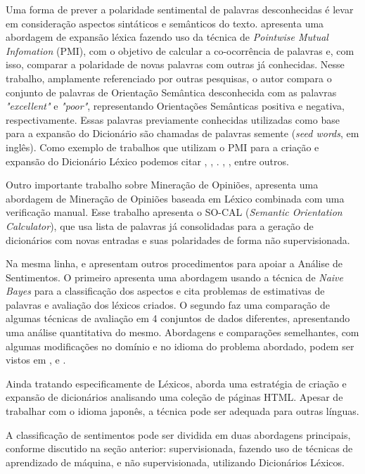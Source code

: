 \documentclass[12pt]{article}
\begin{document}
Uma forma de prever a polaridade sentimental de palavras desconhecidas é levar em consideração aspectos sintáticos e semânticos do texto. \cite{Turney2002} apresenta uma abordagem de expansão léxica fazendo uso da técnica de \emph{Pointwise Mutual Infomation} (PMI), com o objetivo de calcular a co-ocorrência de palavras e, com isso, comparar a polaridade de novas palavras com outras já conhecidas. Nesse trabalho, amplamente referenciado por outras pesquisas, o autor compara o conjunto de palavras de Orientação Semântica desconhecida com as palavras \emph{ "excellent"} e \emph{"poor"}, representando Orientações Semânticas positiva e negativa, respectivamente. Essas palavras previamente conhecidas utilizadas como base para a expansão do Dicionário são chamadas de palavras semente (\emph{seed words}, em inglês). Como exemplo de trabalhos que utilizam o PMI para a criação e expansão do Dicionário Léxico podemos citar \cite{becker2013}, \cite{Zhou2014}, \cite{Pinto2007}. \cite{Pantel2006}, \cite{duwairi2015detecting}, entre outros.

Outro importante trabalho sobre Mineração de Opiniões, \cite{taboada2011lexicon} apresenta uma abordagem de Mineração de Opiniões baseada em Léxico combinada com uma verificação manual. Esse trabalho apresenta o SO-CAL (\emph{Semantic Orientation Calculator}), que usa lista de palavras já consolidadas para a geração de dicionários com novas entradas e suas polaridades de forma não supervisionada.

Na mesma linha, \cite{eisenstein2016unsupervised} e \cite{bandhakavi2016lexicon} apresentam outros procedimentos para apoiar a Análise de Sentimentos. O primeiro apresenta uma abordagem usando a técnica de \emph{Naive Bayes} para a classificação dos aspectos e cita problemas de estimativas de palavras e avaliação dos léxicos criados. O segundo faz uma comparação de algumas técnicas de avaliação em 4 conjuntos de dados diferentes, apresentando uma análise quantitativa do mesmo. Abordagens e comparações semelhantes, com algumas modificações no domínio e no idioma do problema abordado, podem ser vistos em \cite{khoo2017lexicon}, \cite{asghar2014review} e \cite{ding2008holistic}.

Ainda tratando especificamente de Léxicos, \cite{kaji} aborda uma estratégia de criação e expansão de dicionários analisando uma coleção de páginas HTML. Apesar de trabalhar com o idioma japonês, a técnica pode ser adequada para outras línguas.

A classificação de sentimentos pode ser dividida em duas abordagens principais, conforme discutido na seção anterior: supervisionada, fazendo uso de técnicas de aprendizado de máquina, e não supervisionada, utilizando Dicionários Léxicos. \cite{araujo2013metodos}
\end{document}
